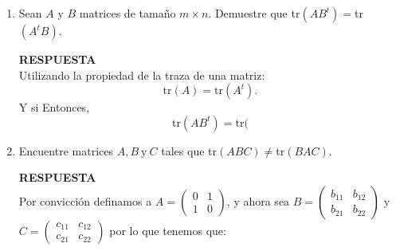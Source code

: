 \documentclass[11pt,letterpaper]{article}
\newcommand{\res}{\textbf{RESPUESTA}\\}
\newcommand{\tr}{\text{tr}}
\begin{document}
\begin{enumerate}
\item Sean $A$ y $B$ matrices de tamaño $m\times n$. Demuestre que tr$(AB^t)=$tr$(A^tB)$. 

\res
Utilizando la propiedad de la traza de una matriz:
$$\tr(A)=\tr(A^t).$$
Y si 
Entonces,
$$\tr(AB^t)=\tr($$
\item Encuentre matrices $A, B \ \text{y} \ C$ tales que tr$(ABC)\neq$tr$(BAC)$.

\res
Por convicción definamos a $A=\left( \begin{array}{cc}
0&1 \\
1&0
\end{array} \right)$, y ahora sea $B=\left( \begin{array}{cc}
b_{11}&b_{12} \\
b_{21}&b_{22}
\end{array} \right)$ y $C=\left( \begin{array}{cc}
c_{11}&c_{12} \\
c_{21}&c_{22}
\end{array} \right)$ por lo que tenemos que:


\end{enumerate}
\end{document}
